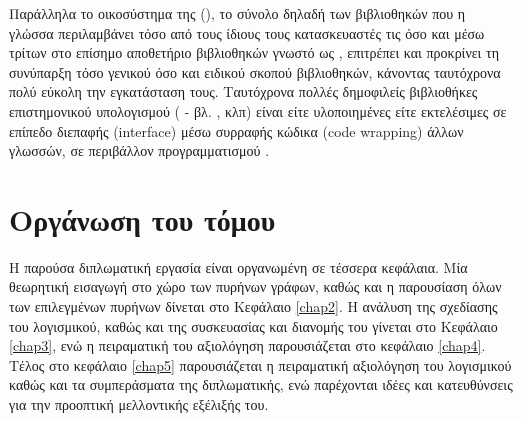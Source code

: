 Παράλληλα το οικοσύστημα της  (), το σύνολο δηλαδή των βιβλιοθηκών που η γλώσσα περιλαμβάνει τόσο από τους ίδιους τους κατασκευαστές τις όσο και μέσω τρίτων στο επίσημο αποθετήριο βιβλιοθηκών γνωστό ως , επιτρέπει και προκρίνει τη συνύπαρξη τόσο γενικού όσο και ειδικού σκοπού βιβλιοθηκών, κάνοντας ταυτόχρονα πολύ εύκολη την εγκατάσταση τους.
Ταυτόχρονα πολλές δημοφιλείς βιβλιοθήκες επιστημονικού υπολογισμού ( - βλ. ,  κλπ) είναι είτε υλοποιημένες είτε εκτελέσιμες σε επίπεδο διεπαφής (interface) μέσω συρραφής κώδικα (code wrapping) άλλων γλωσσών, σε περιβάλλον προγραμματισμού .

\section{Οργάνωση του τόμου}
Η παρούσα διπλωματική εργασία είναι οργανωμένη σε τέσσερα κεφάλαια. Μία θεωρητική εισαγωγή στο χώρο των πυρήνων γράφων, καθώς και η παρουσίαση όλων των επιλεγμένων πυρήνων δίνεται στο Κεφάλαιο \ref{chap2}. Η ανάλυση της σχεδίασης του λογισμικού, καθώς και της συσκευασίας και διανομής του γίνεται στο Κεφάλαιο \ref{chap3}, ενώ η πειραματική του αξιολόγηση παρουσιάζεται στο κεφάλαιο \ref{chap4}. Τέλος στο κεφάλαιο \ref{chap5} παρουσιάζεται η πειραματική αξιολόγηση του λογισμικού καθώς και τα συμπεράσματα της διπλωματικής, ενώ παρέχονται ιδέες και κατευθύνσεις για την προοπτική μελλοντικής εξέλιξής του.
